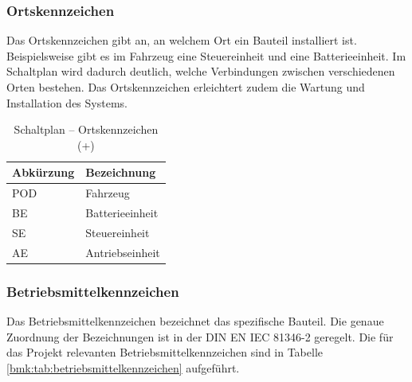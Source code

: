 \subsubsection{Ortskennzeichen}
Das Ortskennzeichen gibt an, an welchem Ort ein Bauteil installiert ist. Beispielsweise gibt es im Fahrzeug eine Steuereinheit und eine Batterieeinheit. Im Schaltplan wird dadurch deutlich, welche Verbindungen zwischen verschiedenen Orten bestehen. Das Ortskennzeichen erleichtert zudem die Wartung und Installation des Systems.

\pagebreak[1]
\begin{table}[!ht]
	\centering
	\caption{Schaltplan – Ortskennzeichen (+)}
	\label{bmk:tab:ortskennzeichen}
	\begin{tabular}{ll}
		\hline
		\textbf{Abkürzung}       & \textbf{Bezeichnung} \\ \hline
		\multicolumn{1}{l|}{POD} & Fahrzeug             \\
		\multicolumn{1}{l|}{BE}  & Batterieeinheit      \\
		\multicolumn{1}{l|}{SE}  & Steuereinheit        \\
		\multicolumn{1}{l|}{AE}  & Antriebseinheit      \\ \hline
	\end{tabular}
\end{table}
\pagebreak[1]

\subsubsection{Betriebsmittelkennzeichen}
Das Betriebsmittelkennzeichen bezeichnet das spezifische Bauteil. Die genaue Zuordnung der Bezeichnungen ist in der DIN EN IEC 81346-2 geregelt. Die für das Projekt relevanten Betriebsmittelkennzeichen sind in Tabelle \ref{bmk:tab:betriebsmittelkennzeichen} aufgeführt.



